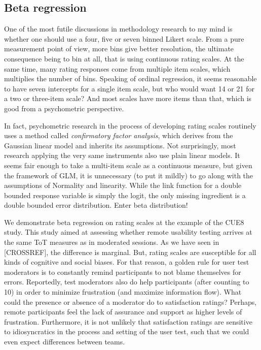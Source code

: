 \documentclass[]{svmono}
\theoremstyle{definition}
\theoremstyle{definition}
\theoremstyle{definition}
\theoremstyle{remark}
\begin{document}
\subsection{Beta regression}\label{beta-regression}

One of the most futile discussions in methodology research to my mind is
whether one should use a four, five or seven binned Likert scale. From a
pure measurement point of view, more bins give better resolution, the
ultimate consequence being to bin at all, that is using continuous
rating scales. At the same time, many rating responses come from
multiple item scales, which multiplies the number of bins. Speaking of
ordinal regression, it seems reasonable to have seven intercepts for a
single item scale, but who would want 14 or 21 for a two or three-item
scale? And most scales have more items than that, which is good from a
psychometric perspective.

In fact, psychometric research in the process of developing rating
scales routinely uses a method called \emph{confirmatory factor
analysis}, which derives from the Gaussian linear model and inherits its
assumptions. Not surprisingly, most research applying the very same
instruments also use plain linear models. It seems fair enough to take a
multi-item scale as a continuous measure, but given the framework of
GLM, it is unnecessary (to put it mildly) to go along with the
assumptions of Normality and linearity. While the link function for a
double bounded response variable is simply the logit, the only missing
ingredient is a double bounded error distribution. Enter beta
distribution!

We demonstrate beta regression on rating scales at the example of the
CUE8 study. This study aimed at assessing whether remote usability
testing arrives at the same ToT measures as in moderated sessions. As we
have seen in {[}CROSSREF{]}, the difference is marginal. But, rating
scales are susceptible for all kinds of cognitive and social biases. For
that reason, a golden rule for user test moderators is to constantly
remind participants to not blame themselves for errors. Reportedly, test
moderators also do help participants (after counting to 10) in order to
minimize frustration (and maximize information flow). What could the
presence or absence of a moderator do to satisfaction ratings? Perhaps,
remote participants feel the lack of assurance and support as higher
levels of frustration. Furthermore, it is not unlikely that satisfaction
ratings are sensitive to idiosyncratics in the process and setting of
the user test, such that we could even expect differences between teams.
\end{document}

